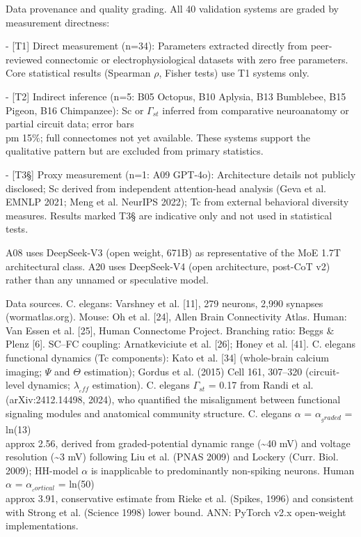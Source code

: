 \documentclass[a4paper,12pt]{article}
\begin{document}
Data provenance and quality grading. All 40 validation systems are graded by measurement directness:


- [T1] Direct measurement (n=34): Parameters extracted directly from peer-reviewed connectomic or electrophysiological datasets with zero free parameters. Core statistical results (Spearman $\rho$, Fisher tests) use T1 systems only.


- [T2\dag] Indirect inference (n=5: B05 Octopus, B10 Aplysia, B13 Bumblebee, B15 Pigeon, B16 Chimpanzee): Sc or $\Gamma_{st}$ inferred from comparative neuroanatomy or partial circuit data; error bars  \\pm 15\%; full connectomes not yet available. These systems support the qualitative pattern but are excluded from primary statistics.


- [T3\S{}] Proxy measurement (n=1: A09 GPT-4o): Architecture details not publicly disclosed; Sc derived from independent attention-head analysis (Geva et al. EMNLP 2021; Meng et al. NeurIPS 2022); Tc from external behavioral diversity measures. Results marked T3\S{} are indicative only and not used in statistical tests.


A08 uses DeepSeek-V3 (open weight, 671B) as representative of the MoE 1.7T architectural class. A20 uses DeepSeek-V4 (open architecture, post-CoT v2) rather than any unnamed or speculative model.


Data sources. C. elegans: Varshney et al. [11], 279 neurons, 2,990 synapses (wormatlas.org). Mouse: Oh et al. [24], Allen Brain Connectivity Atlas. Human: Van Essen et al. [25], Human Connectome Project. Branching ratio: Beggs \& Plenz [6]. SC--FC coupling: Arnatkeviciute et al. [26]; Honey et al. [41]. C. elegans functional dynamics (Tc components): Kato et al. [34] (whole-brain calcium imaging; $\Psi$ and $\Theta$ estimation); Gordus et al. (2015) Cell 161, 307--320 (circuit-level dynamics; $\lambda_{_eff}$ estimation). C. elegans $\Gamma_{st}$ = 0.17 from Randi et al. (arXiv:2412.14498, 2024), who quantified the misalignment between functional signaling modules and anatomical community structure. C. elegans $\alpha$ = $\alpha_{_graded}$ = ln(13)  \\approx  2.56, derived from graded-potential dynamic range (\textasciitilde{}40 mV) and voltage resolution (\textasciitilde{}3 mV) following Liu et al. (PNAS 2009) and Lockery (Curr. Biol. 2009); HH-model $\alpha$ is inapplicable to predominantly non-spiking neurons. Human $\alpha$ = $\alpha_{_cortical}$ = ln(50)  \\approx  3.91, conservative estimate from Rieke et al. (Spikes, 1996) and consistent with Strong et al. (Science 1998) lower bound. ANN: PyTorch v2.x open-weight implementations.
\end{document}
